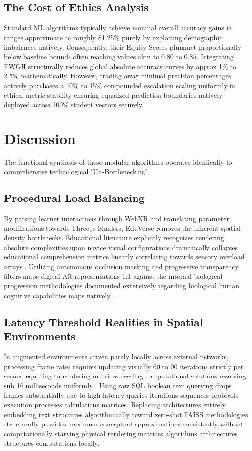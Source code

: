 \documentclass[conference]{IEEEtran}
\begin{document}
\subsection{The Cost of Ethics Analysis}

Standard ML algorithms typically achieve nominal overall accuracy gains in ranges approximate to roughly 81.25\% purely by exploiting demographic imbalances natively. Consequently, their Equity Scores plummet proportionally below baseline bounds often reaching values akin to $0.80$ to $0.85$. Integrating EWGH structurally reduces global absolute accuracy curves by approx 1\% to 2.5\% mathematically. However, trading away minimal precision percentages actively purchases a 10\% to 15\% compounded escalation scaling uniformly in ethical metric stability ensuring equalized prediction boundaries natively deployed across 100\% student vectors securely. 

\section{Discussion}

The functional synthesis of these modular algorithms operates identically to comprehensive technological "Un-Bottlenecking". 

\subsection{Procedural Load Balancing}

By parsing learner interactions through WebXR and translating parameter modifications towards Three.js Shaders, EduVerse removes the inherent spatial density bottlenecks. Educational literature explicitly recognizes rendering absolute complexities upon novice visual configurations dramatically collapses educational comprehension metrics linearly correlating towards sensory overload arrays \cite{li2021scaffolding}. Utilizing autonomous occlusion masking and progressive transparency filters maps digital AR representations 1:1 against the internal biological progression methodologies documented extensively regarding biological human cognitive capabilities maps natively \cite{smith2024cognition}.

\subsection{Latency Threshold Realities in Spatial Environments}

In augmented environments driven purely locally across external networks, processing frame rates requires updating visually 60 to 90 iterations strictly per second equating to rendering matrices needing computational solutions resolving sub 16 milliseconds uniformly \cite{garcia2024tensor}. Using raw SQL boolean text querying drops frames substantially due to high latency queries iterations sequences protocols execution processes calculations matrices. Replacing architectures entirely embedding text structures algorithmically toward zero-shot FAISS methodologies structurally provides maximum conceptual approximations consistently without computationally starving physical rendering matrices algorithms architectures structures computations locally.
\end{document}
